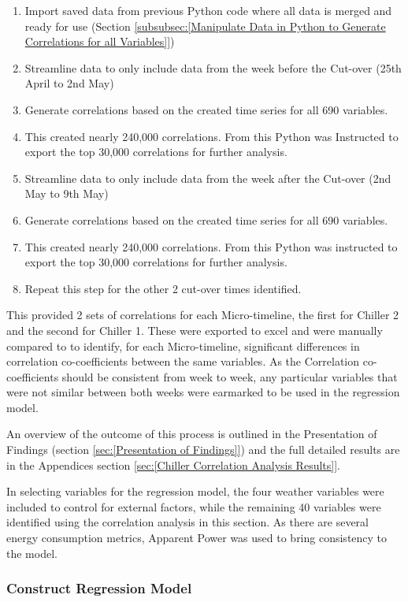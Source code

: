 \documentclass[12pt]{scrartcl}
\begin{document}
\begin{enumerate}
\item Import saved data from previous Python code where all data is merged and ready for use (Section \ref{subsubsec:[Manipulate Data in Python to Generate Correlations for all Variables]})
\item Streamline data to only include data from the week before the Cut-over (25th April to 2nd May)  
\item Generate correlations based on the created time series for all 690 variables.
\item This created nearly 240,000 correlations. From this Python was Instructed to export the top 30,000 correlations for further analysis.
\item Streamline data to only include data from the week after the Cut-over (2nd May to 9th May) 
\item Generate correlations based on the created time series for all 690 variables.
\item This created nearly 240,000 correlations. From this Python was instructed to export the top 30,000 correlations for further analysis.
\item Repeat this step for the other 2 cut-over times identified.
\end{enumerate}  

This provided 2 sets of correlations for each Micro-timeline, the first for Chiller 2 and the second for Chiller 1. These were exported to excel and were manually compared to to identify, for each Micro-timeline, significant differences in correlation co-coefficients between the same variables. As the Correlation co-coefficients should be consistent from week to week, any particular variables that were not similar between both weeks were earmarked to be used in the regression model.

An overview of the outcome of this process is outlined in the Presentation of Findings (section \ref{sec:[Presentation of Findings]}) and the full detailed results are in the Appendices section \ref{sec:[Chiller Correlation Analysis Results]}. 

In selecting variables for the regression model, the four weather variables were included to control for external factors, while the remaining 40 variables were identified using the correlation analysis in this section. As there are several energy consumption metrics, Apparent Power was used to bring consistency to the model.       


\subsubsection{Construct Regression Model}
\label{subsubsec:[Construct Regression Model]}
\end{document}
